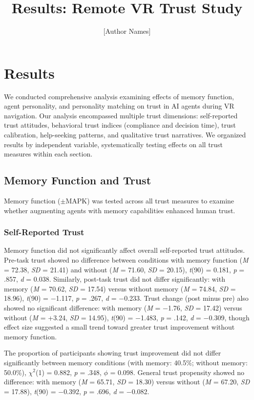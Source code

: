 \documentclass[12pt]{article}
\title{\textbf{Results: Remote VR Trust Study}}
\author{[Author Names]}
\date{}
\begin{document}
\maketitle

\section{Results}

We conducted comprehensive analysis examining effects of memory function, agent personality, and personality matching on trust in AI agents during VR navigation. Our analysis encompassed multiple trust dimensions: self-reported trust attitudes, behavioral trust indices (compliance and decision time), trust calibration, help-seeking patterns, and qualitative trust narratives. We organized results by independent variable, systematically testing effects on all trust measures within each section.

\subsection{Memory Function and Trust}

Memory function ($\pm$MAPK) was tested across all trust measures to examine whether augmenting agents with memory capabilities enhanced human trust.

\subsubsection{Self-Reported Trust}

Memory function did not significantly affect overall self-reported trust attitudes. Pre-task trust showed no difference between conditions with memory function (\textit{M} = 72.38, \textit{SD} = 21.41) and without (\textit{M} = 71.60, \textit{SD} = 20.15), \textit{t}(90) = 0.181, \textit{p} = .857, \textit{d} = 0.038. Similarly, post-task trust did not differ significantly: with memory (\textit{M} = 70.62, \textit{SD} = 17.54) versus without memory (\textit{M} = 74.84, \textit{SD} = 18.96), \textit{t}(90) = $-$1.117, \textit{p} = .267, \textit{d} = $-$0.233. Trust change (post minus pre) also showed no significant difference: with memory (\textit{M} = $-$1.76, \textit{SD} = 17.42) versus without (\textit{M} = +3.24, \textit{SD} = 14.95), \textit{t}(90) = $-$1.483, \textit{p} = .142, \textit{d} = $-$0.309, though effect size suggested a small trend toward greater trust improvement without memory function.

The proportion of participants showing trust improvement did not differ significantly between memory conditions (with memory: 40.5\%; without memory: 50.0\%), $\chi^2$(1) = 0.882, \textit{p} = .348, $\phi$ = 0.098. General trust propensity showed no difference: with memory (\textit{M} = 65.71, \textit{SD} = 18.30) versus without (\textit{M} = 67.20, \textit{SD} = 17.88), \textit{t}(90) = $-$0.392, \textit{p} = .696, \textit{d} = $-$0.082.
\end{document}
